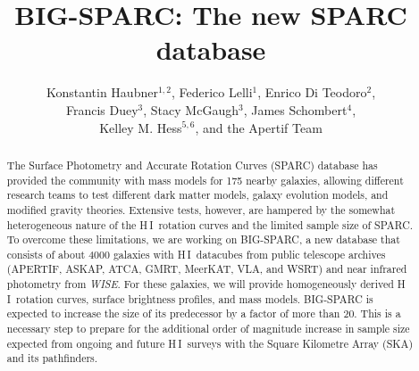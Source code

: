 \documentclass{iau}
\newcommand{\hi}{{\rm H}\,{\small\rm I}}
\begin{document}
\title{BIG-SPARC: The new SPARC database}

\author{
        Konstantin Haubner$^{1,2}$,
        Federico Lelli$^1$,
        Enrico Di Teodoro$^2$,\\
        Francis Duey$^3$,
        Stacy McGaugh$^3$,
        James Schombert$^4$,\\
        Kelley M. Hess$^{5,6}$,
        and the Apertif Team
        }



\begin{abstract}
The Surface Photometry and Accurate Rotation Curves (SPARC) database has provided the community with mass models for 175 nearby galaxies, allowing different research teams to test different dark matter models, galaxy evolution models, and modified gravity theories. Extensive tests, however, are hampered by the somewhat heterogeneous nature of the \hi\ rotation curves and the limited sample size of SPARC. To overcome these limitations, we are working on BIG-SPARC, a new database that consists of about 4000 galaxies with \hi\ datacubes from public telescope archives (APERTIF, ASKAP, ATCA, GMRT, MeerKAT, VLA, and WSRT) and near infrared photometry from \textit{WISE}. For these galaxies, we will provide homogeneously derived \hi\ rotation curves, surface brightness profiles, and mass models. BIG-SPARC is expected to increase the size of its predecessor by a factor of more than 20. This is a necessary step to prepare for the additional order of magnitude increase in sample size expected from ongoing and future \hi\ surveys with the Square Kilometre Array (SKA) and its pathfinders.
\end{abstract}
\end{document}
